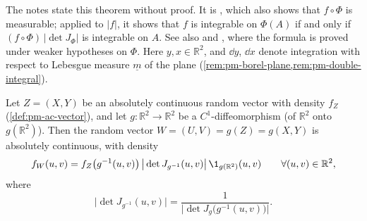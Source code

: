 The notes state this theorem without proof. It is \citet[Theorem~2.47]{folland}, which also shows
that $f\circ\Phi$ is measurable; applied to $|f|$, it shows that $f$ is integrable on $\Phi(A)$ if
and only if $(f\circ\Phi)\,|\det J_\Phi|$ is integrable on $A$. See also \citet[Section~17]{billingsley}
and \citet[Chapter~7]{rudin-rca}, where the formula is proved under weaker hypotheses on $\Phi$.
Here $y,x\in\mathbb R^2$, and $\dd y$, $\dd x$ denote integration with respect to Lebesgue measure
$\underline m$ of the plane (\cref{rem:pm-borel-plane,rem:pm-double-integral}).

\begin{theorem}\label{thm:rv-density}
Let $Z=(X,Y)$ be an absolutely continuous random vector with density $f_Z$
(\cref{def:pm-ac-vector}), and let $g:\mathbb R^2\to\mathbb R^2$ be a $C^1$-diffeomorphism (of
$\mathbb R^2$ onto $g(\mathbb R^2)$). Then the random vector $W=(U,V)=g(Z)=g(X,Y)$ is absolutely
continuous, with density
\[
  f_W(u,v)=f_Z\big(g^{-1}(u,v)\big)\,\big|\det J_{g^{-1}}(u,v)\big|\,\1_{g(\mathbb R^2)}(u,v)
  \qquad\forall(u,v)\in\mathbb R^2,
\]
where
\[
  \big|\det J_{g^{-1}}(u,v)\big|=\frac1{\big|\det J_g\big(g^{-1}(u,v)\big)\big|}.
\]
\end{theorem}

